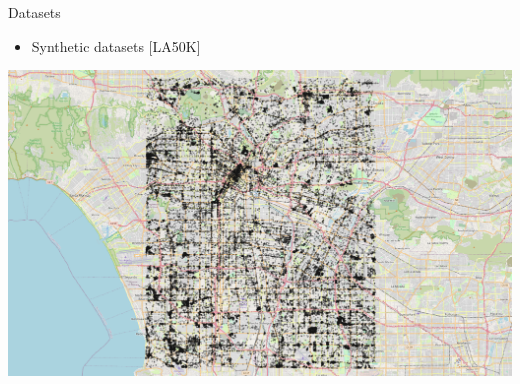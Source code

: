 \documentclass{beamer}
\begin{document}
     \begin{frame}{Datasets}
        \begin{itemize} \item Synthetic datasets [LA50K] \end{itemize} \vspace{0.25cm}

         \centering
         \includegraphics[width=\textwidth]{figures/LA_T320_N50K.png}
     \end{frame}
\end{document}
